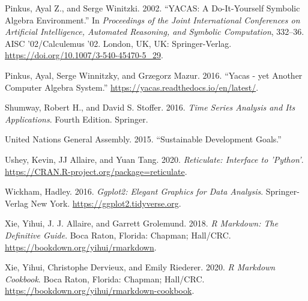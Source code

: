 \begin{CSLReferences}{1}{0}
\leavevmode{}%
Pinkus, Ayal Z., and Serge Winitzki. 2002. {``{YACAS: A Do-It-Yourself Symbolic Algebra Environment}.''} In \emph{Proceedings of the Joint International Conferences on Artificial Intelligence, Automated Reasoning, and Symbolic Computation}, 332--36. AISC '02/Calculemus '02. London, UK, UK: Springer-Verlag. \url{https://doi.org/10.1007/3-540-45470-5_29}.

\leavevmode{}%
Pinkus, Ayal, Serge Winnitzky, and Grzegorz Mazur. 2016. {``Yacas - yet Another Computer Algebra System.''} \url{https://yacas.readthedocs.io/en/latest/}.

\leavevmode{}%
Shumway, Robert H., and David S. Stoﬀer. 2016. \emph{Time Series Analysis and Its Applications}. Fourth Edition. Springer.

\leavevmode{}%
United Nations General Assembly. 2015. {``Sustainable Development Goals.''}

\leavevmode{}%
Ushey, Kevin, JJ Allaire, and Yuan Tang. 2020. \emph{Reticulate: Interface to 'Python'}. \url{https://CRAN.R-project.org/package=reticulate}.

\leavevmode{}%
Wickham, Hadley. 2016. \emph{Ggplot2: Elegant Graphics for Data Analysis}. Springer-Verlag New York. \url{https://ggplot2.tidyverse.org}.

\leavevmode{}%
Xie, Yihui, J. J. Allaire, and Garrett Grolemund. 2018. \emph{R Markdown: The Definitive Guide}. Boca Raton, Florida: Chapman; Hall/CRC. \url{https://bookdown.org/yihui/rmarkdown}.

\leavevmode{}%
Xie, Yihui, Christophe Dervieux, and Emily Riederer. 2020. \emph{R Markdown Cookbook}. Boca Raton, Florida: Chapman; Hall/CRC. \url{https://bookdown.org/yihui/rmarkdown-cookbook}.

\end{CSLReferences}



\address{%
Mikkel Meyer Andersen\\
Department of Mathematical Sciences, Aalborg University, Denmark\\%
Skjernvej 4A\\ 9220 Aalborg Ø, Denmark\\
%
%
\textit{ORCiD: \href{https://orcid.org/0000-0002-0234-0266}{0000-0002-0234-0266}}\\%
\href{mailto:mikl@math.aau.dk}{\nolinkurl{mikl@math.aau.dk}}%
}

\address{%
Søren Højsgaard\\
Department of Mathematical Sciences, Aalborg University, Denmark\\%
Skjernvej 4A\\ 9220 Aalborg Ø, Denmark\\
%
%
\textit{ORCiD: \href{https://orcid.org/0000-0002-3269-9552}{0000-0002-3269-9552}}\\%
\href{mailto:sorenh@math.aau.dk}{\nolinkurl{sorenh@math.aau.dk}}%
}

